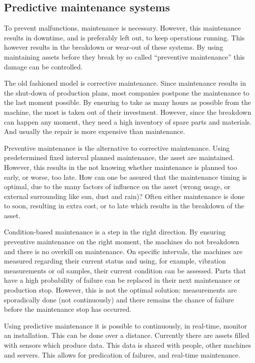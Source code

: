 \subsection{Predictive maintenance systems}
To prevent malfunctions, maintenance is necessary. However, this maintenance results in downtime, and is preferably left out, to keep operations running. This however results in the breakdown or wear-out of these systems. By using maintaining assets before they break by so called ``preventive maintenance'' this damage can be controlled. %

The old fashioned model is corrective maintenance. Since maintenance results in the shut-down of production plans, most companies postpone the maintenance to the last moment possible. By ensuring to take as many hours as possible from the machine, the most is taken out of their investment. However, since the breakdown can happen any moment, they need a high inventory of spare parts and materials.  And usually the repair is more expensive than maintenance. %

Preventive maintenance is the alternative to corrective maintenance. Using predetermined fixed interval planned maintenance, the asset are maintained. However, this results in the not knowing whether maintenance is planned too early, or worse, too late. How can one be assured that the maintenance timing is optimal, due to the many factors of influence on the asset (wrong usage, or external surrounding like sun, dust and rain)? Often either maintenance is done to soon, resulting in extra cost, or to late which results in the breakdown of the asset.

Condition-based maintenance is a step in the right direction. By ensuring preventive maintenance on the right moment, the machines do not breakdown and there is no overkill on maintenance. On specific intervals, the machines are measured regarding their current status and using, for example, vibration measurements or oil samples, their current condition can be assessed. Parts that have a high probability of failure can be replaced in their next maintenance or production stop. However, this is not the optimal solution: measurements are sporadically done (not continuously) and there remains the chance of failure before the maintenance stop has occurred.

Using predictive maintenance it is possible to continuously, in real-time, monitor an installation. This can be done over a distance. Currently there are assets filled with sensors which produce data. This data is shared with people, other machines and servers. This allows for predication of failures, and real-time maintenance.

